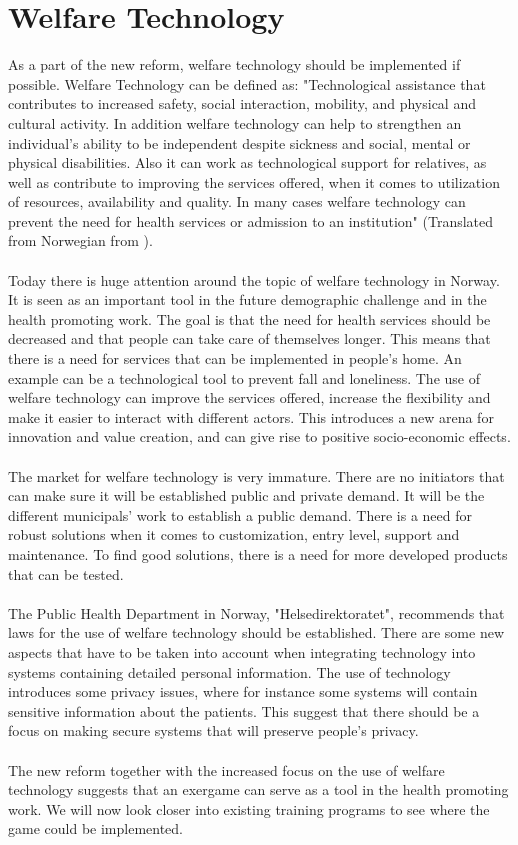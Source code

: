 \section{Welfare Technology}
As a part of the new reform, welfare technology should be implemented if possible. Welfare Technology can be defined as: "Technological assistance that contributes to increased safety, social interaction, mobility, and physical and cultural activity. In addition welfare technology can help to strengthen an individual's ability to be independent despite sickness and social, mental or physical disabilities. Also it can work as technological support for relatives, as well as contribute to improving the services offered, when it comes to utilization of resources, availability and quality. In many cases welfare technology can prevent the need for health services or admission to an institution" (Translated from Norwegian from \cite{welfare}).\\ \\
Today there is huge attention around the topic of welfare technology in Norway. It is seen as an important tool in the future demographic challenge and in the health promoting work.  The goal is that the need for health services should be decreased and that people can take care of themselves longer. This means that there is a need for services that can be implemented in people's home. An example can be a technological tool to prevent fall and loneliness.  The use of welfare technology can improve the services offered, increase the flexibility and make it easier to interact with different actors. This introduces a new arena for innovation and value creation, and can give rise to positive socio-economic effects. \\ \\
The market for welfare technology is very immature. There are no initiators that can make sure it will be established public and private demand. It will be the different municipals' work to establish a public demand. There is a need for robust solutions when it comes to customization, entry level, support and maintenance. To find good solutions, there is a need for more developed products that can be tested.\cite{welfare} \\ \\
The Public Health Department in Norway, "Helsedirektoratet", recommends that laws for the use of welfare technology should be established. There are some new aspects that have to be taken into account when integrating technology into systems containing detailed personal information. The use of technology introduces some privacy issues, where for instance some systems will contain  sensitive information about the patients. This suggest that there should be a focus on making secure systems that will preserve people’s privacy.\cite{welfare} \\ \\
The new reform together with the increased focus on the use of welfare technology suggests that an exergame can serve as a tool in the health promoting work. We will now look closer into existing training programs to see where the game could be implemented.

